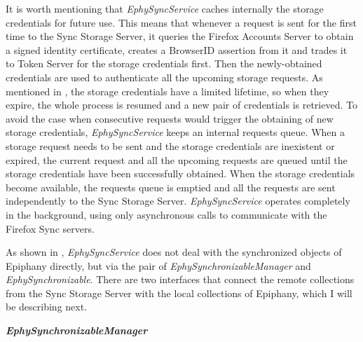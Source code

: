 It is worth mentioning that \textit{EphySyncService} caches internally the storage credentials for future use. This means that whenever a request is sent for the first time to the Sync Storage Server, it queries the Firefox Accounts Server to obtain a signed identity certificate, creates a BrowserID assertion from it and trades it to Token Server for the storage credentials first. Then the newly-obtained credentials are used to authenticate all the upcoming storage requests. As mentioned in , the storage credentials have a limited lifetime, so when they expire, the whole process is resumed and a new pair of credentials is retrieved. To avoid the case when consecutive requests would trigger the obtaining of new storage credentials, \textit{EphySyncService} keeps an internal requests queue. When a storage request needs to be sent and the storage credentials are inexistent or expired, the current request and all the upcoming requests are queued until the storage credentials have been successfully obtained. When the storage credentials become available, the requests queue is emptied and all the requests are sent independently to the Sync Storage Server. \textit{EphySyncService} operates completely in the background, using only asynchronous calls to communicate with the Firefox Sync servers.

As shown in , \textit{EphySyncService} does not deal with the synchronized objects of Epiphany directly, but via the pair of \textit{EphySynchronizableManager} and \textit{EphySynchronizable}. There are two interfaces that connect the remote collections from the Sync Storage Server with the local collections of Epiphany, which I will be describing next.

\textbf{\textit{EphySynchronizableManager}}

